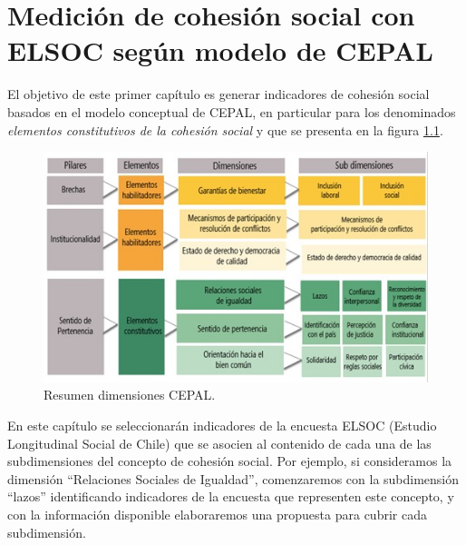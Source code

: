 \documentclass[
  12pt,
]{book}
\begin{document}
\hypertarget{mediciuxf3n-de-cohesiuxf3n-social-con-elsoc-seguxfan-modelo-de-cepal}{%
\chapter{Medición de cohesión social con ELSOC según modelo de CEPAL}\label{mediciuxf3n-de-cohesiuxf3n-social-con-elsoc-seguxfan-modelo-de-cepal}}

El objetivo de este primer capítulo es generar indicadores de cohesión social basados en el modelo conceptual de CEPAL, en particular para los denominados \emph{elementos constitutivos de la cohesión social} y que se presenta en la figura \ref{fig:esquema-cepal}.

\begin{figure}[H]

{\centering \includegraphics[width=1\linewidth,height=1\textheight]{input/images/dimensiones-cepal} 

}

\caption{Resumen dimensiones CEPAL.}\label{fig:esquema-cepal}
\end{figure}

En este capítulo se seleccionarán indicadores de la encuesta ELSOC (Estudio Longitudinal Social de Chile) que se asocien al contenido de cada una de las subdimensiones del concepto de cohesión social. Por ejemplo, si consideramos la dimensión ``Relaciones Sociales de Igualdad'', comenzaremos con la subdimensión ``lazos'' identificando indicadores de la encuesta que representen este concepto, y con la información disponible elaboraremos una propuesta para cubrir cada subdimensión.
\end{document}
